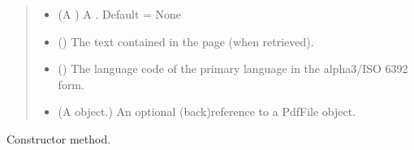 \documentclass[letterpaper,10pt,english]{sphinxmanual}
\begin{document}
\begin{fulllineitems}
\begin{quote}
\begin{description}
\begin{itemize}
\item {} 
\sphinxAtStartPar
{} (A ) \textendash{} A . Default = None

\item {} 
\sphinxAtStartPar
{} () \textendash{} The text contained in the page (when retrieved).

\item {} 
\sphinxAtStartPar
{} () \textendash{} The language code of the primary language in the alpha3/ISO
639\sphinxhyphen{}2 form.

\item {} 
\sphinxAtStartPar
{} (A {\hyperref[\detokenize{generated/bp_text.pdf:bp_text.pdf.PdfFile}]{}} object.) \textendash{} An optional (back\sphinxhyphen{})reference to a PdfFile object.

\end{itemize}

\end{description}\end{quote}

\begin{fulllineitems}
\label{\detokenize{generated/bp_text.pdf:bp_text.pdf.PdfPage.__init__}}
\pysigstartsignatures
\pysiglinewithargsret
{}
{\sphinxparamcomma {}\sphinxparamcomma {}\sphinxparamcomma {}\sphinxparamcomma {}\sphinxparamcomma {}}
{}
\pysigstopsignatures
\sphinxAtStartPar
Constructor method.

\end{fulllineitems}


\end{fulllineitems}
\end{document}
